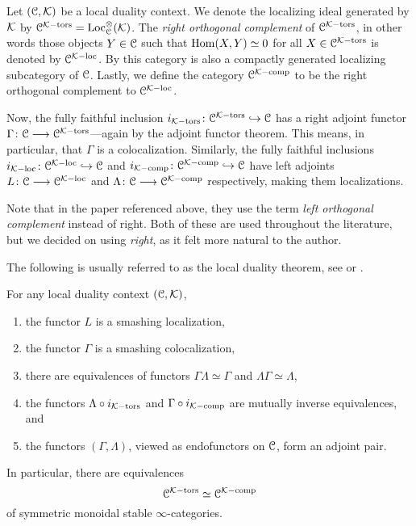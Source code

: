 \begin{construction}
    Let $(\EuScript{C}, \mathcal{K})$ be a local duality context. We denote the localizing ideal generated by $\mathcal{K}$ by $\EuScript{C}^{\mathcal{K}-\mathrm{tors}} = \operatorname{Loc}_{\EuScript{C}}^\otimes(\mathcal{K})$. The \emph{right orthogonal complement} of $\EuScript{C}^{\mathcal{K}-\mathrm{tors}}$, in other words those objects $Y\in \EuScript{C}$ such that $\operatorname{Hom}(X, Y) \simeq 0$ for all $X\in \EuScript{C}^{\mathcal{K}-\mathrm{tors}}$ is denoted by $\EuScript{C}^{\mathcal{K}-\mathrm{loc}}$. By \cite[2.17]{barthel-heard-valenzuela_2018} this category is also a compactly generated localizing subcategory of $\EuScript{C}$. Lastly, we define the category $\EuScript{C}^{\mathcal{K}-\mathrm{comp}}$ to be the right orthogonal complement to $\EuScript{C}^{\mathcal{K}-\mathrm{loc}}$. 

    Now, the fully faithful inclusion $i_{\mathcal{K}-\mathrm{tors}}\colon\EuScript{C}^{\mathcal{K}-\mathrm{tors}}\hookrightarrow \EuScript{C}$ has a right adjoint functor $\Gamma \colon\EuScript{C}\longrightarrow \EuScript{C}^{\mathcal{K}-\mathrm{tors}}$---again by the adjoint functor theorem. This means, in particular, that $\Gamma$ is a colocalization. Similarly, the fully faithful inclusions $i_{\mathcal{K}-\mathrm{loc}}\colon\EuScript{C}^{\mathcal{K}-\mathrm{loc}}\hookrightarrow \EuScript{C}$ and $i_{\mathcal{K}-\mathrm{comp}}\colon\EuScript{C}^{\mathcal{K}-\mathrm{comp}}\hookrightarrow \EuScript{C}$ have left adjoints $L\colon \EuScript{C}\longrightarrow \EuScript{C}^{\mathcal{K}-\mathrm{loc}}$ and $\Lambda\colon\EuScript{C}\longrightarrow \EuScript{C}^{\mathcal{K}-\mathrm{comp}}$ respectively, making them localizations. 
\end{construction}

\begin{remark}
    Note that in the paper \cite{barthel-heard-valenzuela_2018} referenced above, they use the term \emph{left orthogonal complement} instead of right. Both of these are used throughout the literature, but we decided on using \emph{right}, as it felt more natural to the author. 
\end{remark}

The following is usually referred to as the local duality theorem, see \cite[3.3.5]{hovey-palmiery-strickland_97} or \cite[2.21]{barthel-heard-valenzuela_2018}. 

\begin{theorem}
    \label{ch2:thm:local-duality-co-contra}
    For any local duality context $(\EuScript{C}, \mathcal{K})$, 
    \begin{enumerate}
        \item the functor $L$ is a smashing localization,
        \item the functor $\Gamma$ is a smashing colocalization, 
        \item there are equivalences of functors $\Gamma \Lambda \simeq \Gamma$ and $\Lambda\Gamma \simeq \Lambda$,  
        \item the functors $\Lambda\circ i_{\mathcal{K}-\mathrm{tors}}$ and $\Gamma \circ i_{\mathcal{K}-\mathrm{comp}}$ are mutually inverse equivalences, and 
        \item the functors $(\Gamma, \Lambda)$, viewed as endofunctors on $\EuScript{C}$, form an adjoint pair. 
    \end{enumerate} 
    In particular, there are equivalences
    \[\EuScript{C}^{\mathcal{K}-\mathrm{tors}}\simeq \EuScript{C}^{\mathcal{K}-\mathrm{comp}}\]
    of symmetric monoidal stable $\infty$-categories. 
\end{theorem}

